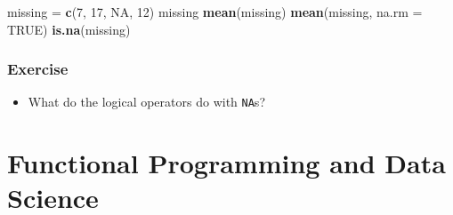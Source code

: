 \documentclass[
]{article}
\newenvironment{Shaded}{\begin{snugshade}}{\end{snugshade}}
\newcommand{\DataTypeTok}[1]{\textcolor[rgb]{0.13,0.29,0.53}{#1}}
\newcommand{\DecValTok}[1]{\textcolor[rgb]{0.00,0.00,0.81}{#1}}
\newcommand{\KeywordTok}[1]{\textcolor[rgb]{0.13,0.29,0.53}{\textbf{#1}}}
\newcommand{\NormalTok}[1]{#1}
\newcommand{\OtherTok}[1]{\textcolor[rgb]{0.56,0.35,0.01}{#1}}
\newcommand{\StringTok}[1]{\textcolor[rgb]{0.31,0.60,0.02}{#1}}
\providecommand{\tightlist}{%
  \setlength{\itemsep}{0pt}\setlength{\parskip}{0pt}}
\begin{document}
\begin{Shaded}
\begin{Highlighting}[]
\NormalTok{missing =}\StringTok{ }\KeywordTok{c}\NormalTok{(}\DecValTok{7}\NormalTok{, }\DecValTok{17}\NormalTok{, }\OtherTok{NA}\NormalTok{, }\DecValTok{12}\NormalTok{)}
\NormalTok{missing}
\KeywordTok{mean}\NormalTok{(missing)}
\KeywordTok{mean}\NormalTok{(missing, }\DataTypeTok{na.rm =} \OtherTok{TRUE}\NormalTok{)}
\KeywordTok{is.na}\NormalTok{(missing)}
\end{Highlighting}
\end{Shaded}

\hypertarget{exercise-3}{%
\subsubsection{Exercise}\label{exercise-3}}

\begin{itemize}
\tightlist
\item
  What do the logical operators do with \texttt{NA}s?
\end{itemize}

\hypertarget{functional-programming-and-data-science}{%
\section{Functional Programming and Data Science}\label{functional-programming-and-data-science}}
\end{document}
